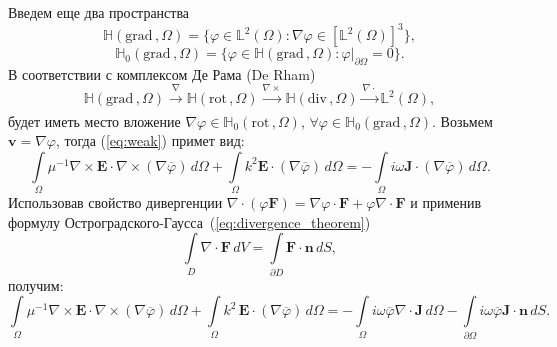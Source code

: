 \documentclass[a4paper,14pt]{article}
\begin{document}
Введем еще два пространства~\citep{monk}
\begin{equation*}
	\mathbb{H}( \mathrm{grad}\,, \Omega ) = \lbrace \varphi \in \mathbb{L}^{2}(\Omega) : \nabla \varphi \in [ \mathbb{L}^{2}(\Omega) ]^{3} \rbrace , \label{eq:H_grad}
\end{equation*}
\begin{equation*}
	\mathbb{H}_{0}( \mathrm{grad}\,, \Omega ) = \lbrace \varphi \in \mathbb{H}( \mathrm{grad}\,, \Omega ) : \left. \varphi \right | _{\partial \Omega} = 0 \rbrace . \label{eq:H0_grad}
\end{equation*}
В соответствии с комплексом Де Рама (De Rham)~\citep{schwarzbach}
\begin{equation}
	\mathbb{H}( \mathrm{grad}\,, \Omega ) \xrightarrow[]{\nabla} \mathbb{H}( \mathrm{rot}\,, \Omega ) \xrightarrow[]{\nabla \times} \mathbb{H}( \mathrm{div}\,, \Omega ) \xrightarrow[]{\nabla \cdot} \mathbb{L}^{2}(\Omega) , \label{eq:derham}
\end{equation}
будет иметь место вложение $\nabla \varphi \in \mathbb{H}_{0}( \mathrm{rot}\,, \Omega )$, $\forall \varphi \in \mathbb{H}_{0}( \mathrm{grad}\,, \Omega )$. Возьмем $\mathbf{v} = \nabla \varphi$, тогда (\ref{eq:weak}) примет вид:
\begin{equation*}
	\int\limits_\Omega \mu^{-1} \nabla \times \mathbf{E} \cdot \nabla \times (\nabla \overline{\varphi}) \,d\Omega + \int\limits_\Omega k^{2} \mathbf{E} \cdot (\nabla \overline{\varphi}) \,d\Omega = - \int\limits_\Omega i \omega \mathbf{J} \cdot (\nabla \overline{\varphi}) \,d\Omega .
\end{equation*}
Использовав свойство дивергенции $\nabla \cdot (\varphi \mathbf{F}) = \nabla \varphi \cdot \mathbf{F} + \varphi \nabla \cdot \mathbf{F}$ и применив формулу Ос\-т\-ро\-г\-ра\-д\-с\-ко\-го-Гаусса~(\ref{eq:divergence_theorem})
\begin{equation}
	\int\limits_{D} \nabla \cdot \mathbf{F} \,dV = \int\limits_{\partial D} \mathbf{F} \cdot \mathbf{n} \,dS ,
	\label{eq:divergence_theorem}
\end{equation}
получим:
\begin{equation*}
	\int\limits_\Omega \mu^{-1} \nabla \times \mathbf{E} \cdot \nabla \times (\nabla \overline{\varphi}) \,d\Omega + \int\limits_\Omega k^{2}\, \mathbf{E} \cdot (\nabla \overline{\varphi}) \,d\Omega = - \int\limits_\Omega i \omega \overline{\varphi} \nabla \cdot \mathbf{J} \,d\Omega - \int\limits_{\partial \Omega} i \omega \overline{\varphi} \mathbf{J} \cdot \mathbf{n} \,d S .
\end{equation*}
\end{document}
